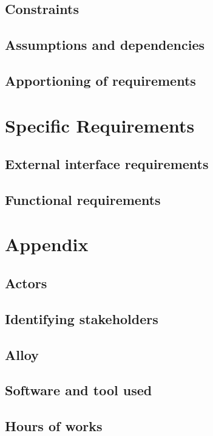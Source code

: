 \documentclass[]{report}
\begin{document}
\section{Constraints}


\section{Assumptions and dependencies}


\section{Apportioning of requirements}


\chapter{Specific Requirements}

\section{External interface requirements}


\section{Functional requirements}




\appendix

\chapter{Appendix}

\section{Actors}


\section{Identifying stakeholders}


\section{Alloy}

\section{Software and tool used}

\section{Hours of works}
\end{document}
